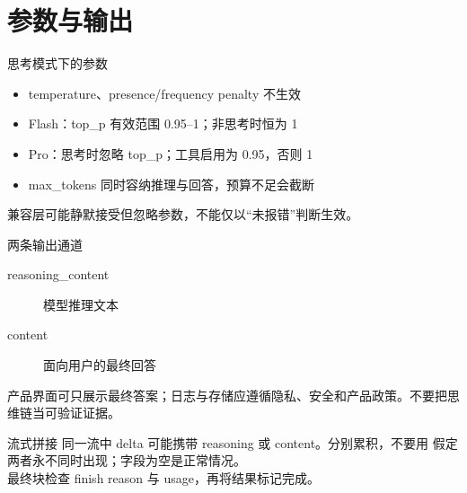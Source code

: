 \documentclass[aspectratio=169,UTF8]{ctexbeamer}
\begin{document}
\section{参数与输出}
\begin{frame}{思考模式下的参数}
\begin{itemize}
  \item temperature、presence/frequency penalty 不生效
  \item Flash：top\_p 有效范围 0.95--1；非思考时恒为 1
  \item Pro：思考时忽略 top\_p；工具启用为 0.95，否则 1
  \item max\_tokens 同时容纳推理与回答，预算不足会截断
\end{itemize}
兼容层可能静默接受但忽略参数，不能仅以“未报错”判断生效。
\end{frame}
\begin{frame}{两条输出通道}
\begin{description}
  \item[reasoning\_content] 模型推理文本
  \item[content] 面向用户的最终回答
\end{description}
产品界面可只展示最终答案；日志与存储应遵循隐私、安全和产品政策。不要把思维链当可验证证据。
\end{frame}
\begin{frame}{流式拼接}
同一流中 delta 可能携带 reasoning 或 content。分别累积，不要用  假定两者永不同时出现；字段为空是正常情况。\\[8pt]
最终块检查 finish reason 与 usage，再将结果标记完成。
\end{frame}
\end{document}
